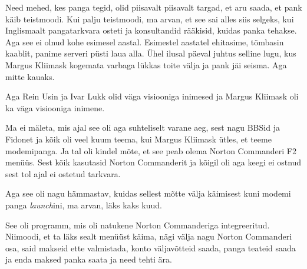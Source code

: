 
Need mehed, kes panga tegid, olid piisavalt piisavalt targad, et aru saada, et pank käib teistmoodi. Kui palju teistmoodi, ma arvan, et see sai alles siis selgeks, kui Inglismaalt pangatarkvara osteti ja konsultandid rääkisid, kuidas panka tehakse. Aga see ei olnud kohe esimesel aastal. Esimestel aastatel ehitasime, tõmbasin kaablit, panime serveri püsti laua alla. Ühel ilusal päeval juhtus selline lugu, kus Margus Kliimask kogemata varbaga lükkas toite välja ja pank jäi seisma. Aga mitte kauaks. 

Aga Rein Usin ja Ivar Lukk olid väga visiooniga inimesed ja Margus Kliimask oli ka väga visiooniga inimene. 

Ma ei mäleta, mis ajal see oli aga  suhteliselt varane aeg, sest nagu BBSid ja Fidonet ja kõik oli veel kuum teema, kui Margus Kliimask ütles, et teeme modemipanga. Ja tal oli kindel mõte, et see peab olema Norton Commanderi F2 menüüs. Sest kõik kasutasid Norton Commanderit ja kõigil oli aga keegi ei ostnud sest tol ajal ei ostetud tarkvara. 


Aga see oli nagu hämmastav, kuidas sellest mõtte välja käimisest kuni modemi panga \emph{launch}ini, ma arvan, läks kaks kuud.


See  oli programm, mis oli natukene Norton Commanderiga integreeritud. Niimoodi, et ta läks sealt menüüst käima, nägi välja nagu Norton Commanderi osa, said makseid ette valmistada, konto väljavõtteid saada, panga teateid saada ja enda maksed panka saata ja need tehti ära.


